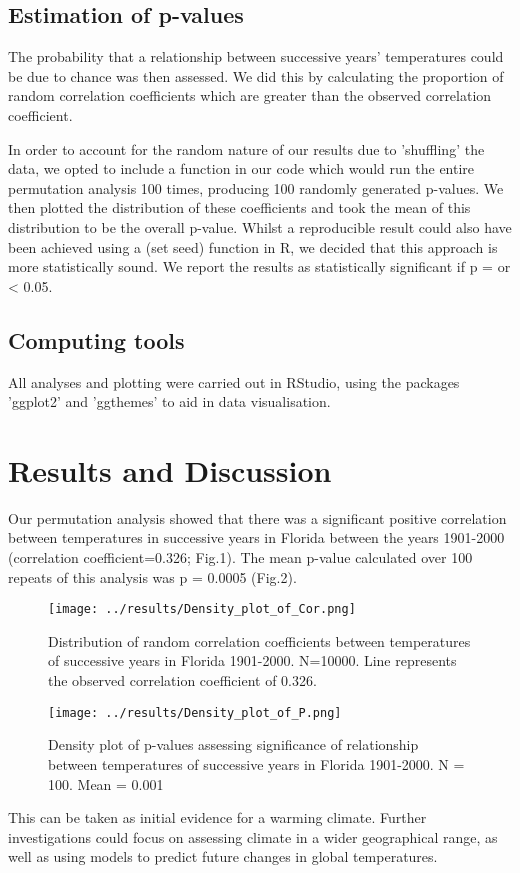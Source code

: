 \documentclass{article}
\begin{document}
	\subsection{Estimation of p-values}
	
	The probability that a relationship between successive years' temperatures could be due to chance was then assessed. We did this by calculating the proportion of random correlation coefficients which are greater than the observed correlation coefficient.
	
	In order to account for the random nature of our results due to 'shuffling' the data, we opted to include a function in our code which would run the entire permutation analysis 100 times, producing 100 randomly generated p-values. We then plotted the distribution of these coefficients and took the mean of this distribution to be the overall p-value. Whilst a reproducible result could also have been achieved using a (set seed) function in R, we decided that this approach is more statistically sound. We report the results as statistically significant if p = or < 0.05.
	
	
	\subsection{Computing tools}
	All analyses and plotting were carried out in RStudio, using the packages 'ggplot2' and 'ggthemes' to aid in data visualisation.
	
	\section{Results and Discussion}
	
	Our permutation analysis showed that there was a significant positive correlation between temperatures in successive years in Florida between the years 1901-2000 (correlation coefficient=0.326; Fig.1). The mean p-value calculated over 100 repeats of this analysis was p = 0.0005 (Fig.2).
	
	\begin{figure}[H]
		\centering
		\texttt{[image: ../results/Density\_plot\_of\_Cor.png]}
		\caption{Distribution of random correlation coefficients between temperatures of successive years in Florida 1901-2000. N=10000. Line represents the observed correlation coefficient of 0.326.}
		\label{fig:my_label}
	\end{figure}
	
	\begin{figure}[H]
		\centering
		\texttt{[image: ../results/Density\_plot\_of\_P.png]}
		\caption{Density plot of p-values assessing significance of relationship between temperatures of successive years in Florida 1901-2000. N = 100. Mean = 0.001}
		\label{fig:my_label}
	\end{figure}
	
	This can be taken as initial evidence for a warming climate. Further investigations could focus on assessing climate in a wider geographical range, as well as using models to predict future changes in global temperatures.
	
\end{document}
